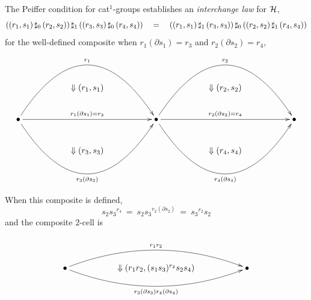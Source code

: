 \bigskip\noindent
The Peiffer condition for cat$^1$-groups establishes an 
  
\emph{interchange law} for $\mathcal{H}$,
$$
((r_1,s_1) \,\sharp_0\, (r_2,s_2)) \,\sharp_1\, ((r_3,s_3) \,\sharp_0\, (r_4,s_4))
\quad = \quad
((r_1,s_1) \,\sharp_1\, (r_3,s_3)) \,\sharp_0\, ((r_2,s_2) \,\sharp_1\, (r_4,s_4)) 
$$
for the well-defined composite 
when $r_1(\partial s_1) = r_3$ and $r_2(\partial s_2) = r_4$,
$$
\xy
\xymatrix{
  && && && && \\
  && \Downarrow (r_1,s_1)
     && && \Downarrow (r_2,s_2)
           && \\
  \bullet \ar@/^15ex/[rrrr]^{r_1} 
          \ar[rrrr]^{r_1(\partial s_1) = r_3}
          \ar@/_15ex/[rrrr]_{r_3(\partial s_3)} 
  && && \bullet \ar@/^15ex/[rrrr]^{r_2} 
                \ar[rrrr]^{r_2(\partial s_2) = r_4}
                \ar@/_15ex/[rrrr]_{r_4(\partial s_4)} 
        && && \bullet \\
  && \Downarrow (r_3,s_3)
     && && \Downarrow (r_4,s_4)
           && \\
  && && && && \\
}
\endxy
$$

\noindent
When this composite is defined, 
$$
    s_2{s_3}^{r_4}
~=~ s_2{s_3}^{r_2(\partial s_2)}
~=~ {s_3}^{r_2}s_2
$$
and the composite $2$-cell is
$$
\xy
\xymatrix{
   && && \\
   \bullet \ar@/^5ex/[rrrr]^{r_1r_2} 
           \ar@/_5ex/[rrrr]_{r_3(\partial s_3)r_4(\partial s_4)} 
   && \Downarrow (r_1r_2,(s_1s_3)^{r_2}s_2s_4)
      && \bullet \\
   && && \\
}
\endxy
$$

